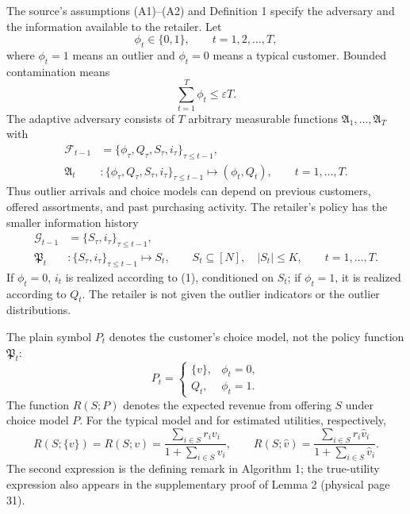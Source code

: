 \documentclass{article}
\begin{document}
The source's assumptions (A1)--(A2) and Definition 1 specify the adversary and the information available to the retailer. Let
\[
\phi_t\in\{0,1\},\qquad t=1,2,\ldots,T,
\]
where $\phi_t=1$ means an outlier and $\phi_t=0$ means a typical customer. Bounded contamination means
\[
\sum_{t=1}^{T}\phi_t\le\varepsilon T. \tag{A1}
\]
The adaptive adversary consists of $T$ arbitrary measurable functions $\mathfrak{A}_1,\ldots,\mathfrak{A}_T$ with
\[
\begin{aligned}
\mathcal{F}_{t-1}&=\{\phi_\tau,Q_\tau,S_\tau,i_\tau\}_{\tau\le t-1},\\
\mathfrak{A}_t &: \{\phi_\tau,Q_\tau,S_\tau,i_\tau\}_{\tau\le t-1}
\longmapsto(\phi_t,Q_t),\qquad t=1,\ldots,T.
\end{aligned}
\tag{A2 / Definition 1}
\]
Thus outlier arrivals and choice models can depend on previous customers, offered assortments, and past purchasing activity. The retailer's policy has the smaller information history
\[
\begin{aligned}
\mathcal{G}_{t-1}&=\{S_\tau,i_\tau\}_{\tau\le t-1},\\
\mathfrak{P}_t &: \{S_\tau,i_\tau\}_{\tau\le t-1}\longmapsto S_t,
\qquad S_t\subseteq[N],\quad |S_t|\le K,
\qquad t=1,\ldots,T.
\end{aligned}
\]
If $\phi_t=0$, $i_t$ is realized according to (1), conditioned on $S_t$; if $\phi_t=1$, it is realized according to $Q_t$. The retailer is not given the outlier indicators or the outlier distributions.

The plain symbol $P_t$ denotes the customer's choice model, not the policy function $\mathfrak{P}_t$:
\[
P_t=\begin{cases}
\{v\},&\phi_t=0,\\
Q_t,&\phi_t=1.
\end{cases}
\]
The function $R(S;P)$ denotes the expected revenue from offering $S$ under choice model $P$. For the typical model and for estimated utilities, respectively,
\[
R(S;\{v\})=R(S;v)=\frac{\sum_{i\in S}r_iv_i}{1+\sum_{i\in S}v_i},
\qquad
R(S;\widehat v)=\frac{\sum_{i\in S}r_i\widehat v_i}{1+\sum_{i\in S}\widehat v_i}.
\]
The second expression is the defining remark in Algorithm 1; the true-utility expression also appears in the supplementary proof of Lemma 2 (physical page 31).
\end{document}
